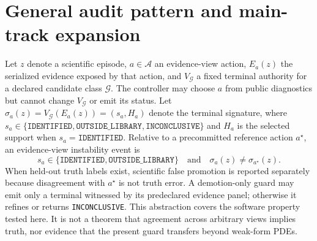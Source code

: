 \documentclass{article}
\newcommand{\ID}{\texttt{IDENTIFIED}\xspace}
\newcommand{\OUT}{\texttt{OUTSIDE\_LIBRARY}\xspace}
\newcommand{\INC}{\texttt{INCONCLUSIVE}\xspace}
\begin{document}
\enlargethispage{3\baselineskip}
\clearpage
\section{General audit pattern and main-track expansion}

Let $z$ denote a scientific episode, $a\in\mathcal A$ an evidence-view action, $E_a(z)$ the
serialized evidence exposed by that action, and $V_{\mathcal G}$ a fixed terminal authority for a
declared candidate class $\mathcal G$. The controller may choose $a$ from public diagnostics but
cannot change $V_{\mathcal G}$ or emit its status. Let
$\sigma_a(z)=V_{\mathcal G}(E_a(z))=(s_a,H_a)$ denote the terminal signature, where
$s_a\in\{\ID,\OUT,\INC\}$ and $H_a$ is the selected support when $s_a=\ID$. Relative to a
precommitted reference action $a^\star$, an evidence-view instability event is
\[
  s_a\in\{\ID,\OUT\}
  \quad\text{and}\quad
  \sigma_a(z)\ne\sigma_{a^\star}(z).
\]
When held-out truth labels exist, scientific false promotion is reported separately because disagreement
with $a^\star$ is not truth error. A demotion-only guard may emit only a terminal witnessed by its
predeclared evidence panel; otherwise it refines or returns \INC. This abstraction covers the
software property tested here. It is not a theorem that agreement across arbitrary views implies
truth, nor evidence that the present guard transfers beyond weak-form PDEs.
\end{document}
